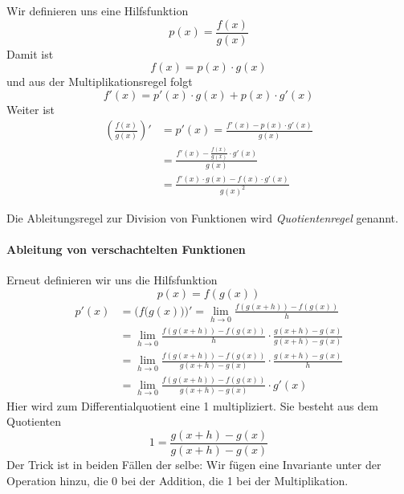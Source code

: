 Wir definieren uns eine Hilfsfunktion 
\begin{equation*}
p(x) = \frac{f(x)}{g(x)}
\end{equation*}
Damit ist 
\begin{equation*}
f(x) = p(x) \cdot g(x)
\end{equation*}
und aus der Multiplikationsregel folgt
\begin{equation*}
f'(x) = p'(x)\cdot g(x)+p(x)\cdot g'(x)
\end{equation*}
Weiter ist
\begin{equation}\label{eq:diff3}
\begin{split}
\left( \frac{f(x)}{g(x)} \right)' &= p'(x) = \frac{f'(x)-p(x)\cdot g'(x)}{g(x)} \\
&= \frac{f'(x)-\frac{f(x)}{g(x)}\cdot g'(x)}{g(x)} \\
&= \frac{f'(x)\cdot g(x)-f(x)\cdot g'(x)}{g(x)^2}
\end{split}
\end{equation}

\begin{definition}
Die Ableitungsregel zur Division von Funktionen wird \emph{Quotientenregel} genannt.
\end{definition}

\paragraph{Ableitung von verschachtelten Funktionen}
Erneut definieren wir uns die Hilfsfunktion
\begin{equation*}
p(x) = f(g(x))
\end{equation*}
\begin{equation}
\begin{split}
p'(x) &= \Big(f\big( g(x) \big)\Big)' = \lim_{h\rightarrow 0} \frac{f(g(x+h))-f(g(x))}{h}\\
&= \lim_{h\rightarrow 0} \frac{f(g(x+h))-f(g(x))}{h} \cdot \frac{g(x+h)-g(x)}{g(x+h)-g(x)} \\
&= \lim_{h\rightarrow 0} \frac{f(g(x+h))-f(g(x))}{g(x+h)-g(x)} \cdot \frac{g(x+h)-g(x)}{h} \\
&= \lim_{h\rightarrow 0} \frac{f(g(x+h))-f(g(x))}{g(x+h)-g(x)} \cdot g'(x)
\end{split}
\end{equation}
Hier wird zum Differentialquotient eine 1 multipliziert. Sie besteht aus dem Quotienten
\begin{equation*}
1=\frac{g(x+h)-g(x)}{g(x+h)-g(x)}
\end{equation*}
Der Trick ist in beiden Fällen der selbe: Wir fügen eine Invariante unter der Operation hinzu, die 0 bei der Addition, die 1 bei der Multiplikation.

